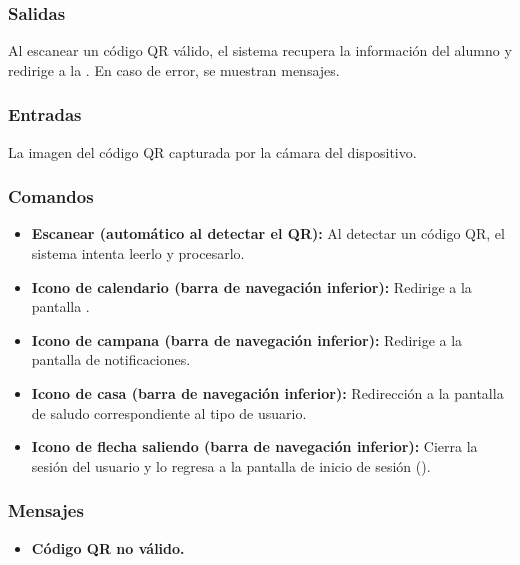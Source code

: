 \subsubsection{Salidas}
Al escanear un código QR válido, el sistema recupera la información del alumno y redirige a la . En caso de error, se muestran mensajes.

\subsubsection{Entradas}
La imagen del código QR capturada por la cámara del dispositivo.

\subsubsection{Comandos}
\begin{itemize}
	\item \textbf{Escanear (automático al detectar el QR):} Al detectar un código QR, el sistema intenta leerlo y procesarlo.
	\item \textbf{Icono de calendario (barra de navegación inferior):} Redirige a la pantalla .
	\item \textbf{Icono de campana (barra de navegación inferior):} Redirige a la pantalla de notificaciones.
	\item \textbf{Icono de casa (barra de navegación inferior):} Redirección a la pantalla de saludo correspondiente al tipo de usuario.
	\item \textbf{Icono de flecha saliendo (barra de navegación inferior):} Cierra la sesión del usuario y lo regresa a la pantalla de inicio de sesión ().
\end{itemize}

\subsubsection{Mensajes}
\begin{itemize}
	\item \textbf{ Código QR no válido.}
\end{itemize}


